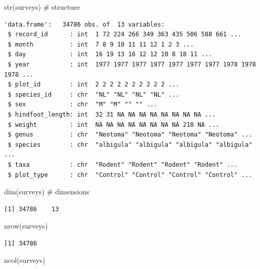 \documentclass[
  letterpaper,
  DIV=11,
  numbers=noendperiod]{scrreprt}
\newenvironment{Shaded}{\begin{snugshade}}{\end{snugshade}}
\newcommand{\CommentTok}[1]{\textcolor[rgb]{0.37,0.37,0.37}{#1}}
\newcommand{\FunctionTok}[1]{\textcolor[rgb]{0.28,0.35,0.67}{#1}}
\newcommand{\NormalTok}[1]{\textcolor[rgb]{0.00,0.23,0.31}{#1}}
\begin{document}
\begin{Shaded}
\begin{Highlighting}[]
\FunctionTok{str}\NormalTok{(surveys)      }\CommentTok{\# structure}
\end{Highlighting}
\end{Shaded}

\begin{verbatim}
'data.frame':   34786 obs. of  13 variables:
 $ record_id      : int  1 72 224 266 349 363 435 506 588 661 ...
 $ month          : int  7 8 9 10 11 11 12 1 2 3 ...
 $ day            : int  16 19 13 16 12 12 10 8 18 11 ...
 $ year           : int  1977 1977 1977 1977 1977 1977 1977 1978 1978 1978 ...
 $ plot_id        : int  2 2 2 2 2 2 2 2 2 2 ...
 $ species_id     : chr  "NL" "NL" "NL" "NL" ...
 $ sex            : chr  "M" "M" "" "" ...
 $ hindfoot_length: int  32 31 NA NA NA NA NA NA NA NA ...
 $ weight         : int  NA NA NA NA NA NA NA NA 218 NA ...
 $ genus          : chr  "Neotoma" "Neotoma" "Neotoma" "Neotoma" ...
 $ species        : chr  "albigula" "albigula" "albigula" "albigula" ...
 $ taxa           : chr  "Rodent" "Rodent" "Rodent" "Rodent" ...
 $ plot_type      : chr  "Control" "Control" "Control" "Control" ...
\end{verbatim}

\begin{Shaded}
\begin{Highlighting}[]
\FunctionTok{dim}\NormalTok{(surveys)      }\CommentTok{\# dimensions}
\end{Highlighting}
\end{Shaded}

\begin{verbatim}
[1] 34786    13
\end{verbatim}

\begin{Shaded}
\begin{Highlighting}[]
\FunctionTok{nrow}\NormalTok{(surveys)}
\end{Highlighting}
\end{Shaded}

\begin{verbatim}
[1] 34786
\end{verbatim}

\begin{Shaded}
\begin{Highlighting}[]
\FunctionTok{ncol}\NormalTok{(surveys)}
\end{Highlighting}
\end{Shaded}
\end{document}
